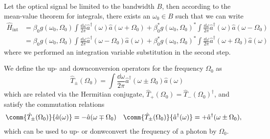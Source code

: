 Let the optical signal be limited to the bandwidth $B$, then
according to the mean-value theorem for integrals, there exists an $\omega_0\in B$ such that we can write
\begin{equation}
	\begin{split}
		\hat{H}_\text{int}
		&=
		\beta_0
		g(\omega_0,\Omega_0)
		\int\frac{\dd{\omega}}{2\pi}
		\hat{a}^\dagger(\omega)
		\hat{a}(\omega+\Omega_0)
		+
		\beta_0^*
		g(\omega_0,\Omega_0)^*
		\int\frac{\dd{\omega}}{2\pi}
		\hat{a}^\dagger(\omega)
		\hat{a}(\omega-\Omega_0)
		\\
		&=
		\beta_0
		g(\omega_0,\Omega_0)
		\int\frac{\dd{\omega}}{2\pi}
		\hat{a}^\dagger(\omega-\Omega_0)
		\hat{a}(\omega)
		+
		\beta_0^*
		g(\omega_0,\Omega_0)^*
		\int\frac{\dd{\omega}}{2\pi}
		\hat{a}^\dagger(\omega+\Omega_0)
		\hat{a}(\omega)
	\end{split}
	\label{eq:frequency_conversion_interaction_meanvalue}
\end{equation}
where we performed an integration variable substitution in the second step.

We define the up- and downconversion operators for the frequency $\Omega_0$ as
\begin{equation}
	\hat{T}_\pm(\Omega_0)
	=
	\int\frac{\dd{\omega}}{2\pi}
	\hat{a}^\dagger(\omega\pm\Omega_0)
	\hat{a}(\omega)
	\label{eq:frequency_conversion_operator}
\end{equation}
which are related via the Hermitian conjugate, $\hat{T}_+(\Omega_0)=\hat{T}_-(\Omega_0)^\dagger$, and satisfy the commutation relations
\begin{align}
	\comm{\hat{T}_\pm(\Omega_0)}{\hat{a}(\omega)}
	&=
	-
	\hat{a}(\omega\mp\Omega_0)
	&
	\comm{\hat{T}_\pm(\Omega_0)}{\hat{a}^\dagger(\omega)}
	&=
	+
	\hat{a}^\dagger(\omega\pm\Omega_0)
	,
\end{align}
which can be used to up- or donwconvert the frequency of a photon by $\Omega_0$.

